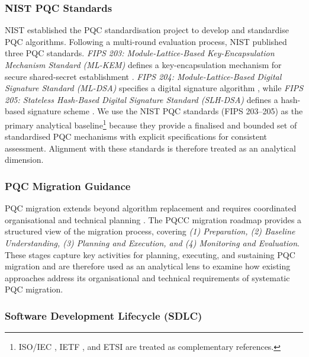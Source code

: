 \documentclass[letterpaper,twocolumn,10pt]{article}
\begin{document}
\subsubsection{NIST PQC Standards}
\label{NISTPQC}

NIST established the PQC standardisation project \cite{nist_pqc} to develop and standardise PQC algorithms. Following a multi-round evaluation process, NIST published three PQC standards. \textit{FIPS 203: Module-Lattice-Based Key-Encapsulation Mechanism Standard (ML-KEM)} defines a key-encapsulation mechanism for secure shared-secret establishment \cite{nist_fips_203_2024}. \textit{FIPS 204: Module-Lattice-Based Digital Signature Standard (ML-DSA)} specifies a digital signature algorithm \cite{nist_fips_204_2024}, while \textit{FIPS 205: Stateless Hash-Based Digital Signature Standard (SLH-DSA)} defines a hash-based signature scheme \cite{nist_fips_205_2024}. We use the NIST PQC standards (FIPS 203--205) as the primary analytical baseline\footnote{ISO/IEC \cite{ISO_IEC_18033_2_Amd2_2026}, IETF \cite{rfc9958}, and ETSI \cite{ETSI_TR_103_618_2019} are treated as complementary references.} because they provide a finalised and bounded set of standardised PQC mechanisms with explicit specifications for consistent assessment. Alignment with these standards is therefore treated as an analytical dimension.

\subsubsection{PQC Migration Guidance}
\label{PQCMigGuide}

PQC migration extends beyond algorithm replacement and requires coordinated organisational and technical planning \cite{Campbell}. The PQCC migration roadmap \cite{pqcc_pqc_migration_roadmap_2025} provides a structured view of the migration process, covering \textit{(1) Preparation, (2) Baseline Understanding, (3) Planning and Execution, and (4) Monitoring and Evaluation}. These stages capture key activities for planning, executing, and sustaining PQC migration and are therefore used as an analytical lens to examine how existing approaches address its organisational and technical requirements of systematic PQC migration.

\subsubsection{Software Development Lifecycle (SDLC)}
\label{SDLC_ref}
\end{document}
